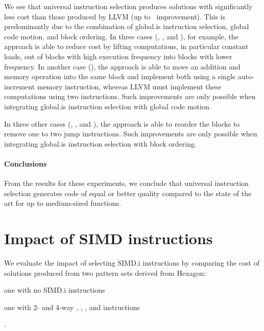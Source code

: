 We see that \gls{universal instruction selection} produces \glspl{solution} with
significantly less cost than those produced by \gls{LLVM} (up to~\printZCNorm{%
  \UnisonVsLlvmHexagonFiveCyclesSpeedupCyclesZeroCenteredSpeedupMax%
} improvement).
%
This is predominantly due to the combination of \gls{global.is}
\gls{instruction selection}, \gls{global code motion}, and \gls{block ordering}.
%
In three cases (, , and
), for example, the approach is able to reduce cost by lifting
computations, in particular constant loads, out of \glspl{block} with high
execution frequency into \glspl{block} with lower frequency.
%
In another case (), the approach is able to move an addition
and memory \gls{operation} into the same \gls{block} and implement both using a
single auto-increment memory \gls{instruction}, whereas \gls{LLVM} must
implement these computations using two \glspl{instruction}.
%
Such improvements are only possible when integrating \gls{global.is}
\gls{instruction selection} with \gls{global code motion}.

In three other cases (, ,
and ), the approach is able to reorder the
\glspl{block} to remove one to two jump \glspl{instruction}.
%
Such improvements are only possible when integrating \gls{global.is}
\gls{instruction selection} with \gls{block ordering}.


\paragraph{Conclusions}

From the results for these experiments, we conclude that \gls{universal
  instruction selection} generates code of equal or better quality compared to
the state of the art for up to medium-sized \glspl{function}.


\section{Impact of SIMD instructions}

We evaluate the impact of selecting \gls{SIMD.i} \glspl{instruction}
by comparing the cost of \glspl{solution} produced from two \glspl{pattern set}
derived from \gls{Hexagon}:
%
\begin{patternList}
  \item {}
    one with no \gls{SIMD.i} \glspl{instruction}
  \item {}
    one with \num{2}- and \num{4}-way , , ,
    and  \glspl{instruction}
\end{patternList}.


